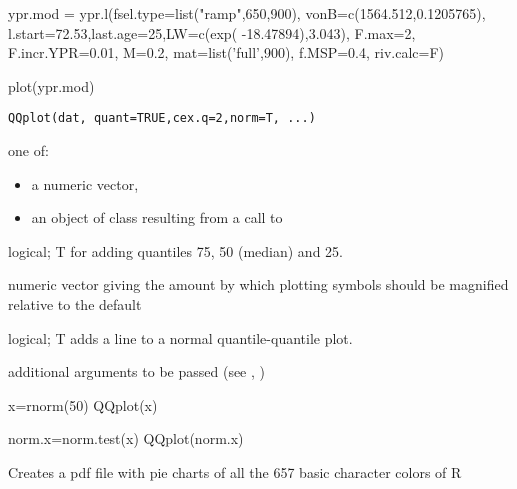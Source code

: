 \documentclass[a4paper]{book}
\begin{document}
%
\begin{Examples}
\begin{ExampleCode}
ypr.mod = ypr.l(fsel.type=list("ramp",650,900), vonB=c(1564.512,0.1205765), 
                l.start=72.53,last.age=25,LW=c(exp( -18.47894),3.043), F.max=2,
                F.incr.YPR=0.01, M=0.2, mat=list('full',900), f.MSP=0.4, riv.calc=F)  

plot(ypr.mod)

\end{ExampleCode}
\end{Examples}
\newpage
{}
%
\begin{Usage}
\begin{verbatim}
QQplot(dat, quant=TRUE,cex.q=2,norm=T, ...)
\end{verbatim}
\end{Usage}
%
\begin{Arguments}
\begin{ldescription}
\item[\code{dat}] one of:
\begin{itemize}

\item a numeric vector,
\item an object of class  resulting from a
call to 
\end{itemize}


\item[\code{quant}] logical; T for adding quantiles 75, 50 (median) and 25.
\item[\code{cex.q}] numeric vector giving the amount by which plotting symbols should be magnified relative to the default
\item[\code{norm}] logical; T adds a line to a normal quantile-quantile plot.
\item[\code{...}] additional arguments to be passed (see , )
\end{ldescription}
\end{Arguments}
%
\begin{Examples}
\begin{ExampleCode}
x=rnorm(50)
QQplot(x)

norm.x=norm.test(x)
QQplot(norm.x)  
\end{ExampleCode}
\end{Examples}
\newpage
{}
%
\begin{Description}\relax
Creates a pdf file with pie charts of all the 657 basic character colors of R
\end{Description}
\end{document}

